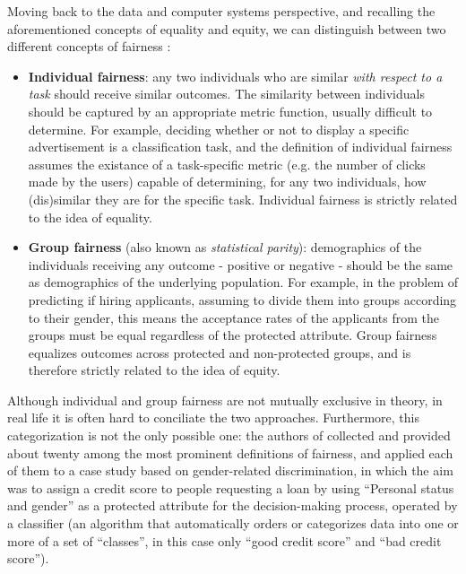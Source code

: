 Moving back to the data and computer systems perspective, and recalling the aforementioned concepts of equality and equity, we can distinguish between two different concepts of fairness \cite{dwork2012fairness}:
\begin{itemize}
\item \textbf{Individual fairness}: any two individuals who are similar \textit{with respect to a task} should receive similar outcomes. The similarity between individuals should be captured by an appropriate metric function, usually difficult to determine. For example, deciding whether or not to display a specific advertisement is a classification task, and the definition of individual fairness assumes the existance of a task-specific metric (e.g. the number of clicks made by the users) capable of determining, for any two individuals, how (dis)similar they are for the specific task. Individual fairness is strictly related to the idea of equality.
\item \textbf{Group fairness} (also known as \textit{statistical parity}): demographics of the individuals receiving any outcome - positive or negative - should be the same as demographics of the underlying population. For example, in the problem of predicting if hiring applicants, assuming to divide them into groups according to their gender, this means the acceptance rates of the applicants from the groups must be equal regardless of the protected attribute. Group fairness equalizes outcomes across protected and non-protected groups, and is therefore strictly related to the idea of equity.
\end{itemize}

Although individual and group fairness are not mutually exclusive in theory, in real life it is often hard to conciliate the two approaches. Furthermore, this categorization is not the only possible one: the authors of \cite{verma2018fairness} collected and provided about twenty among the most prominent definitions of fairness, and applied each of them to a case study based on gender-related discrimination, in which the aim was to assign a credit score to people requesting a loan by using ``Personal status and gender'' as a protected attribute for the decision-making process, operated by a classifier (an algorithm that automatically orders or categorizes data into one or more of a set of ``classes'', in this case only ``good credit score'' and ``bad credit score'').

